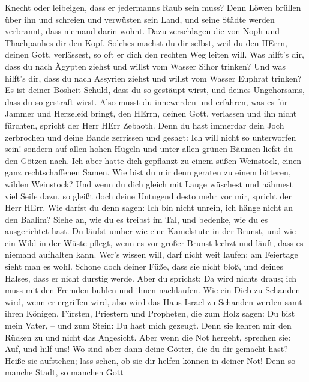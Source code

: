 Knecht oder leibeigen, dass er jedermanns Raub sein muss? 
Denn Löwen brüllen über ihn und schreien und verwüsten sein Land, und
seine Städte werden verbrannt, dass niemand darin wohnt. 
Dazu zerschlagen die von Noph und Thachpanhes dir den Kopf.
 Solches machst du dir selbst, weil du den HErrn, deinen
Gott, verlässest, so oft er dich den rechten Weg leiten will.
 Was hilft's dir, dass du nach Ägypten ziehst und willst
vom Wasser Sihor trinken? Und was hilft's dir, dass du nach Assyrien
ziehst und willst vom Wasser Euphrat trinken?  Es ist
deiner Bosheit Schuld, dass du so gestäupt wirst, und deines
Ungehorsams, dass du so gestraft wirst. Also musst du innewerden und
erfahren, was es für Jammer und Herzeleid bringt, den HErrn, deinen
Gott, verlassen und ihn nicht fürchten, spricht der Herr HErr Zebaoth.
 Denn du hast immerdar dein Joch zerbrochen und deine Bande
zerrissen und gesagt: Ich will nicht so unterworfen sein! sondern auf
allen hohen Hügeln und unter allen grünen Bäumen liefst du den Götzen
nach.  Ich aber hatte dich gepflanzt zu einem süßen
Weinstock, einen ganz rechtschaffenen Samen. Wie bist du mir denn
geraten zu einem bitteren, wilden Weinstock?  Und wenn du
dich gleich mit Lauge wüschest und nähmest viel Seife dazu, so gleißt
doch deine Untugend desto mehr vor mir, spricht der Herr HErr.
 Wie darfst du denn sagen: Ich bin nicht unrein, ich hänge
nicht an den Baalim? Siehe an, wie du es treibst im Tal, und bedenke,
wie du es ausgerichtet hast.  Du läufst umher wie eine
Kamelstute in der Brunst, und wie ein Wild in der Wüste pflegt, wenn es
vor großer Brunst lechzt und läuft, dass es niemand aufhalten kann.
Wer's wissen will, darf nicht weit laufen; am Feiertage sieht man es
wohl.  Schone doch deiner Füße, dass sie nicht bloß, und
deines Halses, dass er nicht durstig werde. Aber du sprichst: Da wird
nichts draus; ich muss mit den Fremden buhlen und ihnen nachlaufen.
 Wie ein Dieb zu Schanden wird, wenn er ergriffen wird,
also wird das Haus Israel zu Schanden werden samt ihren Königen,
Fürsten, Priestern und Propheten,  die zum Holz sagen: Du
bist mein Vater, -- und zum Stein: Du hast mich gezeugt. Denn sie kehren
mir den Rücken zu und nicht das Angesicht. Aber wenn die Not hergeht,
sprechen sie: Auf, und hilf uns!  Wo sind aber dann deine
Götter, die du dir gemacht hast? Heiße sie aufstehen; lass sehen, ob sie
dir helfen können in deiner Not! Denn so manche Stadt, so manchen Gott
